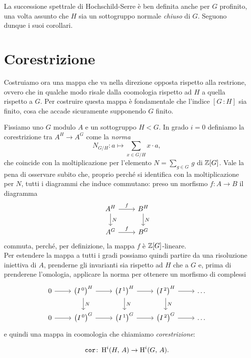 \begin{profinite}
	La successione spettrale di Hochschild-Serre è ben definita anche per $ G $ profinito, una volta assunto che $ H $ sia un sottogruppo normale \emph{chiuso} di $ G $. Seguono dunque i suoi corollari. \todo[ah si? perche?]
\end{profinite}


\section{Corestrizione}
Costruiamo ora una mappa che va nella direzione opposta rispetto alla restrione, ovvero che in qualche modo risale dalla coomologia rispetto ad $ H $ a quella rispetto a $ G $. Per costruire questa mappa è fondamentale che l'indice $ [G \, \colon H] $ sia finito, cosa che accade sicuramente supponendo $ G $ finito.

\begin{definition}[Corestrizione]
Fissiamo uno $ G $ modulo $ A $ e un sottogruppo $ H < G $. In grado $ i = 0 $ definiamo la corestrizione tra $ A^H \to A^G $  come la \emph{norma}
\[N_{G/H} \colon a \mapsto \sum_{x \in G/H} x \cdot a, \]
che coincide con la moltiplicazione per l'elemento $ N = \sum_{g \in G} \, g $ di $ \mathbb{Z}[G] $. Vale la pena di osservare subito che, proprio perché si identifica con la moltiplicazione per $ N $, tutti i diagrammi che induce commutano: preso un morfismo $ f \colon A \to B $ il diagramma
\[\begin{tikzcd}
A^H \rar["f"] \dar{N} 
& B^H \arrow[d, "N"]\\
A^G \rar["f"]
& B^G
\end{tikzcd}\] 
commuta, perché, per definizione, la mappa $ f $ è $ \mathbb{Z}[G] $-lineare. \\

Per estendere la mappa a tutti i gradi possiamo quindi partire da una risoluzione iniettiva di $ A $, prenderne gli invarianti sia rispetto ad $ H $ che a $ G $ e, prima di prenderene l'omologia, applicare la norma per ottenere un morfismo di complessi
\[\begin{tikzcd}
0 \rar
& \left(I^{\,0}\right)^H \rar \dar["N"]
& \left(I^{\,1}\right)^H \rar \dar["N"]
& \left(I^{\,2}\right)^H \rar \dar["N"]
& \dots \\
0 \rar
& \left(I^{\,0}\right)^{G} \rar
& \left(I^{\,1}\right)^{G} \rar
& \left(I^{\,2}\right)^{G} \rar
& \dots
\end{tikzcd} \]
e quindi una mappa in coomologia che chiamiamo \emph{corestrizione}:

\[ \operatorname{\mathtt{cor}} \colon \operatorname{H}^i(H, \, A) \to \operatorname{H}^i(G, \, A). \]

\end{definition}

